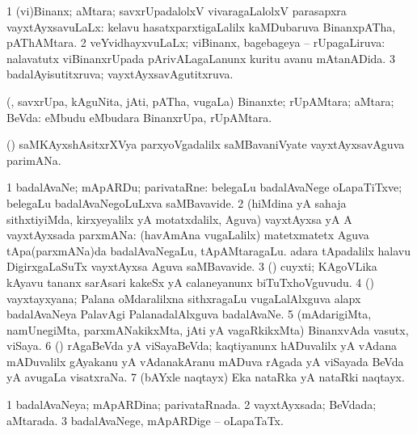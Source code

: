 \bentry
{} 
\gl{\gu}
\expl{}
\bmng
\bnum
\num{1} (vi)Binanx; aMtara; savxrUpadalolxV vivaragaLalolxV parasapxra vayxtAyxsavuLaLx:  kelavu hasatxparxtigaLalilx kaMDubaruva BinanxpATha, pAThAMtara. 
\num{2} veYvidhayxvuLaLx; viBinanx, bagebageya -- rUpagaLiruva:  nalavatutx viBinanxrUpada pArivALagaLanunx kuritu avanu mAtanADida. 
\num{3} badalAyisutitxruva; vayxtAyxsavAgutitxruva. 
\enum
\emng
\eentry

\bentry
{} 
\gl{\nA}
\expl{}
\bmng
 (\rUpa, savxrUpa, kAguNita, jAti, pATha, \mo vugaLa) Binanxte; rUpAMtara; aMtara; BeVda:  eMbudu  eMbudara BinanxrUpa, rUpAMtara. 
\emng
\eentry

\bentry
{} 
\gl{\nA}
\expl{}
\bmng
 (\saMshA) saMKAyxshAsitxrXVya parxyoVgadalilx saMBavaniVyate vayxtAyxsavAguva parimANa. 
\emng
\eentry

\bentry
{} 
\gl{\nA}
\expl{}
\bmng
\bnum
\num{1} badalAvaNe; mApARDu; parivataRne:  belegaLu badalAvaNege oLapaTiTxve; belegaLu badalAvaNegoLuLxva saMBavavide. 
\num{2} (hiMdina yA sahaja sithxtiyiMda, kirxyeyalilx yA motatxdalilx, Aguva) vayxtAyxsa yA A vayxtAyxsada parxmANa:  (havAmAna \mo vugaLalilx) matetxmatetx Aguva tApa(parxmANa)da badalAvaNegaLu, tApAMtaragaLu.  adara tApadalilx halavu DigirxgaLaSuTx vayxtAyxsa Aguva saMBavavide. 
\num{3} (\Kavi) cuyxti; KAgoVLika kAyavu tananx sarAsari kakeSx yA calaneyanunx biTuTxhoVguvudu. 
\num{4} (\ga) vayxtayxyana; Palana oMdaralilxna sithxragaLu \mo vugaLalAlxguva alapx badalAvaNeya PalavAgi PalanadalAlxguva badalAvaNe. 
\num{5} (mAdarigiMta, namUnegiMta, parxmANakikxMta, jAti yA vagaRkikxMta) BinanxvAda vasutx, viSaya. 
\num{6} (\saM) rAgaBeVda yA viSayaBeVda; kaqtiyanunx hADuvalilx yA vAdana mADuvalilx gAyakanu yA vAdanakAranu mADuva rAgada yA viSayada BeVda yA avugaLa visatxraNa. 
\num{7} (bAYxle naqtayx) Eka nataRka yA nataRki naqtayx. 
\enum
\emng
\eentry

\bentry
{} 
\gl{\gu}
\expl{}
\bmng
\bnum
\num{1} badalAvaNeya; mApARDina; parivataRnada. 
\num{2} vayxtAyxsada; BeVdada; aMtarada. 
\num{3} badalAvaNege, mApARDige -- oLapaTaTx. 
\enum
\emng
\eentry

